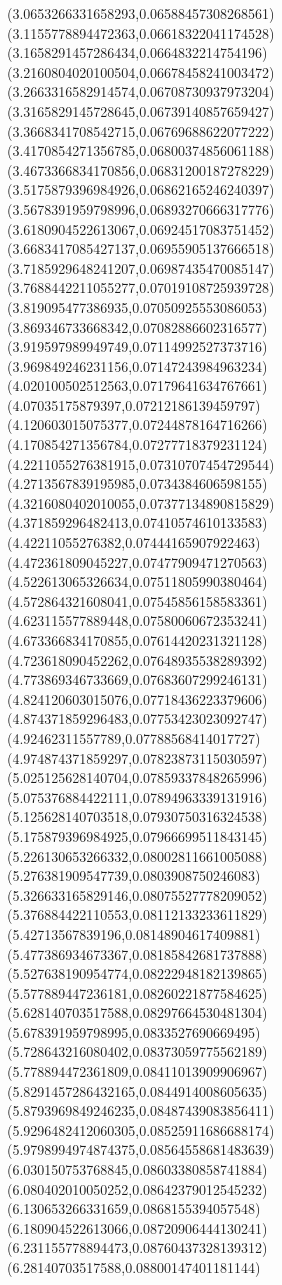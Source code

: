 {(3.0653266331658293,0.06588457308268561)
(3.1155778894472363,0.06618322041174528)
(3.1658291457286434,0.0664832214754196)
(3.2160804020100504,0.06678458241003472)
(3.2663316582914574,0.06708730937973204)
(3.3165829145728645,0.06739140857659427)
(3.3668341708542715,0.06769688622077222)
(3.4170854271356785,0.06800374856061188)
(3.4673366834170856,0.06831200187278229)
(3.5175879396984926,0.06862165246240397)
(3.5678391959798996,0.06893270666317776)
(3.6180904522613067,0.06924517083751452)
(3.6683417085427137,0.06955905137666518)
(3.7185929648241207,0.06987435470085147)
(3.7688442211055277,0.07019108725939728)
(3.819095477386935,0.07050925553086053)
(3.869346733668342,0.07082886602316577)
(3.919597989949749,0.07114992527373716)
(3.969849246231156,0.07147243984963234)
(4.020100502512563,0.07179641634767661)
(4.07035175879397,0.07212186139459797)
(4.120603015075377,0.07244878164716266)
(4.170854271356784,0.07277718379231124)
(4.2211055276381915,0.07310707454729544)
(4.2713567839195985,0.0734384606598155)
(4.3216080402010055,0.07377134890815829)
(4.371859296482413,0.07410574610133583)
(4.42211055276382,0.07444165907922463)
(4.472361809045227,0.07477909471270563)
(4.522613065326634,0.07511805990380464)
(4.572864321608041,0.07545856158583361)
(4.623115577889448,0.07580060672353241)
(4.673366834170855,0.07614420231321128)
(4.723618090452262,0.07648935538289392)
(4.773869346733669,0.07683607299246131)
(4.824120603015076,0.07718436223379606)
(4.874371859296483,0.07753423023092747)
(4.92462311557789,0.07788568414017727)
(4.974874371859297,0.07823873115030597)
(5.025125628140704,0.07859337848265996)
(5.075376884422111,0.07894963339131916)
(5.125628140703518,0.07930750316324538)
(5.175879396984925,0.07966699511843145)
(5.226130653266332,0.08002811661005088)
(5.276381909547739,0.0803908750246083)
(5.326633165829146,0.08075527778209052)
(5.376884422110553,0.08112133233611829)
(5.42713567839196,0.08148904617409881)
(5.477386934673367,0.08185842681737888)
(5.527638190954774,0.08222948182139865)
(5.577889447236181,0.08260221877584625)
(5.628140703517588,0.08297664530481304)
(5.678391959798995,0.0833527690669495)
(5.728643216080402,0.08373059775562189)
(5.778894472361809,0.08411013909906967)
(5.8291457286432165,0.0844914008605635)
(5.8793969849246235,0.08487439083856411)
(5.9296482412060305,0.08525911686688174)
(5.9798994974874375,0.08564558681483639)
(6.030150753768845,0.08603380858741884)
(6.080402010050252,0.08642379012545232)
(6.130653266331659,0.0868155394057548)
(6.180904522613066,0.08720906444130241)
(6.231155778894473,0.08760437328139312)
(6.28140703517588,0.08800147401181144)
}
